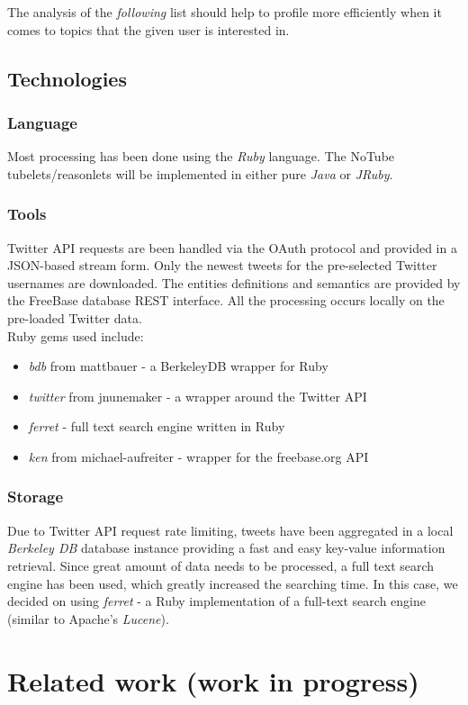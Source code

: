 \documentclass{article}
\begin{document}
The analysis of the \textit{following} list should help to profile more efficiently when it comes to topics that the given user is interested in.

\subsection{Technologies}
\subsubsection{Language}
Most processing has been done using the \textit{Ruby} language. The NoTube tubelets/reasonlets will be implemented in either pure \textit{Java} or \textit{JRuby}.
\subsubsection{Tools}
Twitter API requests are been handled via the OAuth protocol and provided in a JSON-based stream form. Only the newest tweets for the pre-selected Twitter usernames are downloaded. The entities definitions and semantics are provided by the FreeBase database REST interface. All the processing occurs locally on the pre-loaded Twitter data. \\ Ruby gems used include:
\begin{itemize}
  \item \textit{bdb} from mattbauer - a BerkeleyDB wrapper for Ruby
  \item \textit{twitter} from jnunemaker - a wrapper around the Twitter API
  \item \textit{ferret} - full text search engine written in Ruby
  \item \textit{ken} from michael-aufreiter - wrapper for the freebase.org API
\end{itemize}
\subsubsection{Storage}
Due to Twitter API request rate limiting, tweets have been aggregated in a local
\textit{Berkeley DB} database instance providing a fast and easy key-value
information retrieval. Since great amount of data needs to be processed, a full
text search engine has been used, which greatly increased the searching time. In
this case, we decided on using \textit{ferret} - a Ruby implementation of a
full-text search engine (similar to Apache's \textit{Lucene}).


\section{Related work (work in progress)}
\end{document}
